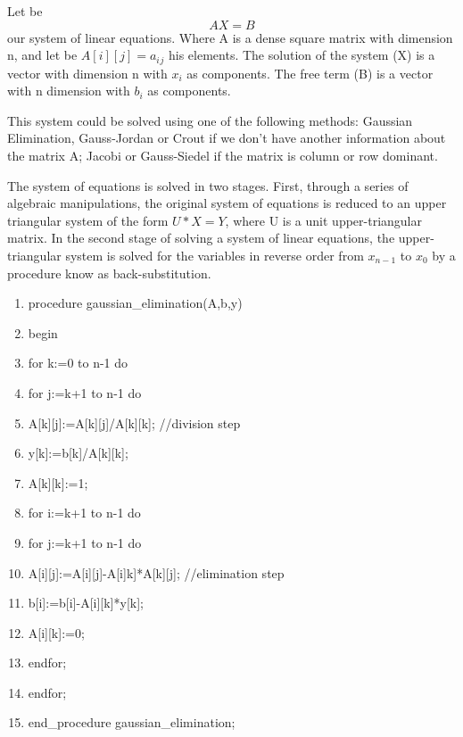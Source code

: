 \documentclass[times,10pt,twocolumn]{article}
\begin{document}

Let be \begin{equation}AX=B\label{s1}\end{equation} our system of
linear equations. Where A is a dense square matrix with dimension
n, and let be $A[i][j]=a{_i}{_j}$ his elements. The solution of
the system (X) is a vector with dimension n with $x_i$ as
components. The free term (B) is a vector with n dimension with
$b_i$ as components.

This system could be solved using one of the following methods:
Gaussian Elimination, Gauss-Jordan or Crout if we don't have
another information about the matrix A; Jacobi or Gauss-Siedel if
the matrix is column or row dominant.



The system of equations is solved in two stages. First, through a
series of algebraic manipulations, the original system of
equations is reduced to an upper triangular system of the form
$U*X=Y$, where U is a unit upper-triangular matrix. In the second
stage of solving a system of linear equations, the
upper-triangular system is solved for the variables in reverse
order from $x_{n-1}$ to $x_0$ by a procedure know as
back-substitution.

\begin{enumerate}
\item procedure gaussian\_elimination(A,b,y)
\item begin
\item for k:=0 to n-1 do
\item for j:=k+1 to n-1 do
\item A[k][j]:=A[k][j]/A[k][k]; //division step
\item y[k]:=b[k]/A[k][k];
\item A[k][k]:=1;
\item for i:=k+1 to n-1 do
\item for j:=k+1 to n-1 do
\item A[i][j]:=A[i][j]-A[i]k]*A[k][j]; //elimination step
\item b[i]:=b[i]-A[i][k]*y[k];
\item A[i][k]:=0;
\item endfor;
\item endfor;
\item end\_procedure gaussian\_elimination;
\end{enumerate}
\end{document}
